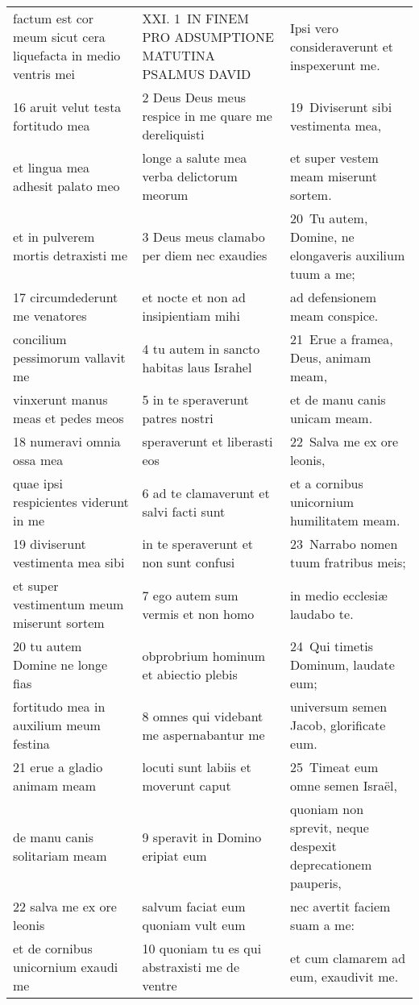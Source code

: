 \documentclass{article}
\begin{document}
\begin{longtable}{@{}p{}p{}p{}@{}}
factum est cor meum sicut cera liquefacta in medio ventris mei	&	XXI. 1 IN FINEM PRO ADSUMPTIONE MATUTINA PSALMUS DAVID	&	Ipsi vero consideraverunt et inspexerunt me.	\\
16 aruit velut testa fortitudo mea	&	2 Deus Deus meus respice in me quare me dereliquisti	&	19 Diviserunt sibi vestimenta mea,	\\
et lingua mea adhesit palato meo	&	longe a salute mea verba delictorum meorum	&	et super vestem meam miserunt sortem.	\\
et in pulverem mortis detraxisti me	&	3 Deus meus clamabo per diem nec exaudies	&	20 Tu autem, Domine, ne elongaveris auxilium tuum a me;	\\
17 circumdederunt me venatores	&	et nocte et non ad insipientiam mihi	&	ad defensionem meam conspice.	\\
concilium pessimorum vallavit me	&	4 tu autem in sancto habitas laus Israhel	&	21 Erue a framea, Deus, animam meam,	\\
vinxerunt manus meas et pedes meos	&	5 in te speraverunt patres nostri	&	et de manu canis unicam meam.	\\
18 numeravi omnia ossa mea	&	speraverunt et liberasti eos	&	22 Salva me ex ore leonis,	\\
quae ipsi respicientes viderunt in me	&	6 ad te clamaverunt et salvi facti sunt	&	et a cornibus unicornium humilitatem meam.	\\
19 diviserunt vestimenta mea sibi	&	in te speraverunt et non sunt confusi	&	23 Narrabo nomen tuum fratribus meis;	\\
et super vestimentum meum miserunt sortem	&	7 ego autem sum vermis et non homo	&	in medio ecclesiæ laudabo te.	\\
20 tu autem Domine ne longe fias	&	obprobrium hominum et abiectio plebis	&	24 Qui timetis Dominum, laudate eum;	\\
fortitudo mea in auxilium meum festina	&	8 omnes qui videbant me aspernabantur me	&	universum semen Jacob, glorificate eum.	\\
21 erue a gladio animam meam	&	locuti sunt labiis et moverunt caput	&	25 Timeat eum omne semen Israël,	\\
de manu canis solitariam meam	&	9 speravit in Domino eripiat eum	&	quoniam non sprevit, neque despexit deprecationem pauperis,	\\
22 salva me ex ore leonis	&	salvum faciat eum quoniam vult eum	&	nec avertit faciem suam a me:	\\
et de cornibus unicornium exaudi me	&	10 quoniam tu es qui abstraxisti me de ventre	&	et cum clamarem ad eum, exaudivit me.	\\

\end{longtable}
\end{document}

